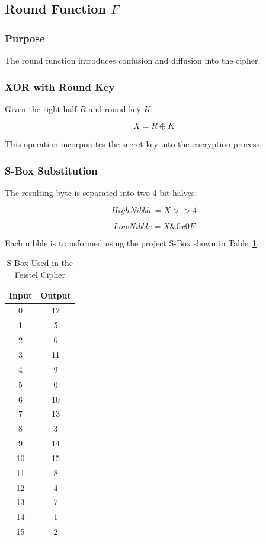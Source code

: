 \documentclass[12pt]{article}
\begin{document}
\subsection{Round Function $F$}

\subsubsection{Purpose}

The round function introduces confusion and diffusion into the cipher.

\subsubsection{XOR with Round Key}

Given the right half $R$ and round key $K$:

\[
X = R \oplus K
\]

This operation incorporates the secret key into the encryption process.

\subsubsection{S-Box Substitution}

The resulting byte is separated into two 4-bit halves:

\[
HighNibble = X >> 4
\]

\[
LowNibble = X \mathbin{\&} 0x0F
\]

Each nibble is transformed using the project S-Box shown in Table~\ref{tab:sbox}.

\begin{table}[h]
\centering
\caption{S-Box Used in the Feistel Cipher}
\label{tab:sbox}
\begin{tabular}{|c|c|}
\hline
Input & Output \\
\hline
0 & 12 \\
1 & 5 \\
2 & 6 \\
3 & 11 \\
4 & 9 \\
5 & 0 \\
6 & 10 \\
7 & 13 \\
8 & 3 \\
9 & 14 \\
10 & 15 \\
11 & 8 \\
12 & 4 \\
13 & 7 \\
14 & 1 \\
15 & 2 \\
\hline
\end{tabular}
\end{table}
\end{document}
